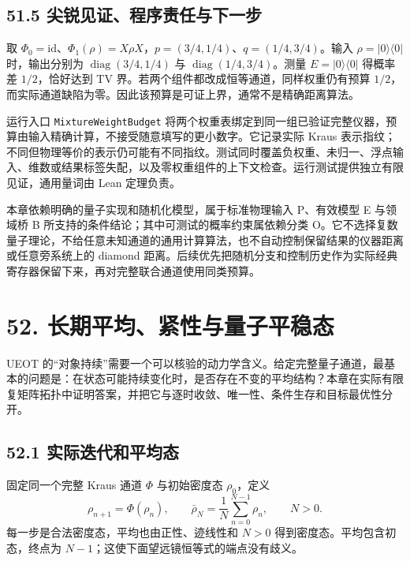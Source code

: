 \documentclass[
  11pt,
  oneside]{book}
\begin{document}
\hypertarget{ux5c16ux9510ux89c1ux8bc1ux7a0bux5e8fux8d23ux4efbux4e0eux4e0bux4e00ux6b65}{%
\section{51.5
尖锐见证、程序责任与下一步}\label{ux5c16ux9510ux89c1ux8bc1ux7a0bux5e8fux8d23ux4efbux4e0eux4e0bux4e00ux6b65}}

取
\(\Phi_0=\mathrm{id}\)、\(\Phi_1(\rho)=X\rho X\)，\(p=(3/4,1/4)\)、\(q=(1/4,3/4)\)。输入
\(\rho=|0\rangle\langle0|\) 时，输出分别为
\(\operatorname{diag}(3/4,1/4)\) 与
\(\operatorname{diag}(1/4,3/4)\)。测量 \(E=|0\rangle\langle0|\) 得概率差
\(1/2\)，恰好达到 TV 界。若两个组件都改成恒等通道，同样权重仍有预算
\(1/2\)，而实际通道缺陷为零。因此该预算是可证上界，通常不是精确距离算法。

运行入口 \texttt{MixtureWeightBudget}
将两个权重表绑定到同一组已验证完整仪器，预算由输入精确计算，不接受随意填写的更小数字。它记录实际
Kraus
表示指纹；不同但物理等价的表示仍可能有不同指纹。测试同时覆盖负权重、未归一、浮点输入、维数或结果标签失配，以及零权重组件的上下文检查。运行测试提供独立有限见证，通用量词由
Lean 定理负责。

本章依赖明确的量子实现和随机化模型，属于标准物理输入 P、有效模型 E
与领域桥 B 所支持的条件结论；其中可测试的概率约束属依赖分类
O。它不选择复数量子理论，不给任意未知通道的通用计算算法，也不自动控制保留结果的仪器距离或任意旁系统上的
diamond
距离。后续优先把随机分支和控制历史作为实际经典寄存器保留下来，再对完整联合通道使用同类预算。

\hypertarget{ch-52}{%
\chapter{52. 长期平均、紧性与量子平稳态}\label{ch-52}}

UEOT
的``对象持续''需要一个可以核验的动力学含义。给定完整量子通道，最基本的问题是：在状态可能持续变化时，是否存在不变的平均结构？本章在实际有限复矩阵拓扑中证明答案，并把它与逐时收敛、唯一性、条件生存和目标最优性分开。

\hypertarget{ux5b9eux9645ux8fedux4ee3ux548cux5e73ux5747ux6001}{%
\section{52.1
实际迭代和平均态}\label{ux5b9eux9645ux8fedux4ee3ux548cux5e73ux5747ux6001}}

固定同一个完整 Kraus 通道 \(\Phi\) 与初始密度态 \(\rho_0\)，定义 \[
\rho_{n+1}=\Phi(\rho_n),\qquad
\bar\rho_N=\frac1N\sum_{n=0}^{N-1}\rho_n,\qquad N>0.
\] 每一步是合法密度态，平均也由正性、迹线性和 \(N>0\)
得到密度态。平均包含初态，终点为
\(N-1\)；这使下面望远镜恒等式的端点没有歧义。
\end{document}
